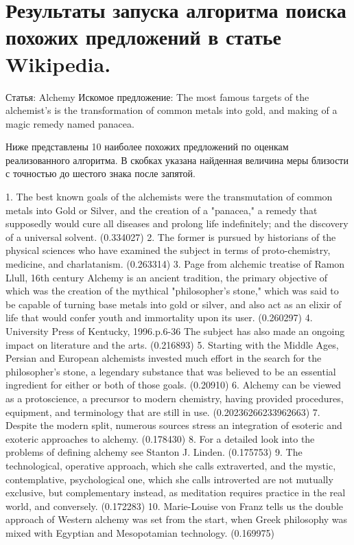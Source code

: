 \section{Результаты запуска алгоритма поиска похожих предложений в статье Wikipedia.}
\label{app:sentence_wikipedia_search}

Статья: Alchemy
Искомое предложение: The most famous targets of the alchemist's is the transformation of common metals into gold, and making of a magic remedy named panacea.

Ниже представлены 10 наиболее похожих предложений по оценкам реализованного алгоритма.
В скобках указана найденная величина меры близости с точностью до шестого знака после запятой.

1. The best known goals of the alchemists were the transmutation of common metals into Gold or Silver, and the creation of a "panacea," a remedy that supposedly would cure all diseases and prolong life indefinitely; and the discovery of a universal solvent. (0.334027)
2. The former is pursued by historians of the physical sciences who have examined the subject in terms of proto-chemistry, medicine, and charlatanism. (0.263314)
3. Page from alchemic treatise of Ramon Llull, 16th century Alchemy is an ancient tradition, the primary objective of which was the creation of the mythical "philosopher's stone," which was said to be capable of turning base metals into gold or silver, and also act as an elixir of life that would confer youth and immortality upon its user. (0.260297)
4. University Press of Kentucky, 1996.p.6-36  The subject has also made an ongoing impact on literature and the arts. (0.216893)
5. Starting with the Middle Ages, Persian and European alchemists invested much effort in the search for the philosopher's stone, a legendary substance that was believed to be an essential ingredient for either or both of those goals. (0.20910)
6. Alchemy can be viewed as a protoscience, a precursor to modern chemistry, having provided procedures, equipment, and terminology that are still in use. (0.20236266233962663)
7. Despite the modern split, numerous sources stress an integration of esoteric and exoteric approaches to alchemy. (0.178430)
8. For a detailed look into the problems of defining alchemy see Stanton J. Linden. (0.175753)
9. The technological, operative approach, which she calls extraverted, and the mystic, contemplative, psychological one, which she calls introverted are not mutually exclusive, but complementary instead, as meditation requires practice in the real world, and conversely. (0.172283)
10. Marie-Louise von Franz tells us the double approach of Western alchemy was set from the start, when Greek philosophy was mixed with Egyptian and Mesopotamian technology. (0.169975)
